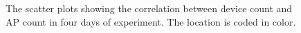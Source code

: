 \begin{figure}[H]
\begin{adjustwidth}{-4cm}{}
{{    }
  }
  \end{adjustwidth}
  \caption[The scatter plots of the correlation between device count and \ac{AP}.]
  {The scatter plots showing the correlation between device count and \ac{AP} count in four days of experiment. The location is coded in color.}
  \label{fig:ap-dc-scatterplot}
\end{figure}


